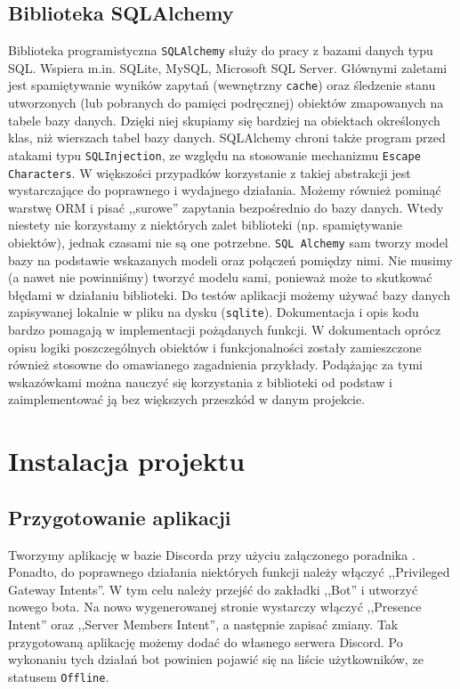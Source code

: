 \documentclass[shortabstract,inz]{iithesis}
\begin{document}
		\section{Biblioteka SQLAlchemy}
			Biblioteka programistyczna \texttt{SQLAlchemy} służy do pracy z bazami danych typu SQL. Wspiera m.in. SQLite, MySQL, Microsoft SQL Server. Głównymi zaletami jest spamiętywanie wyników zapytań (wewnętrzny \texttt{cache}) oraz śledzenie stanu utworzonych (lub pobranych do pamięci podręcznej) obiektów zmapowanych na tabele bazy danych. Dzięki niej skupiamy się bardziej na obiektach określonych klas, niż wierszach tabel bazy danych. SQLAlchemy chroni także program przed atakami typu \texttt{SQLInjection}, ze względu na stosowanie mechanizmu \texttt{Escape Characters}. W większości przypadków korzystanie z takiej abstrakcji jest wystarczające do poprawnego i wydajnego działania. Możemy również pominąć warstwę ORM i pisać ,,surowe'' zapytania bezpośrednio do bazy danych. Wtedy niestety nie korzystamy z niektórych zalet biblioteki (np. spamiętywanie obiektów), jednak czasami nie są one potrzebne. \texttt{SQL Alchemy} sam tworzy model bazy na podstawie wskazanych modeli oraz połączeń pomiędzy nimi. Nie musimy (a nawet nie powinniśmy) tworzyć modelu sami, ponieważ może to skutkować błędami w działaniu biblioteki. Do testów aplikacji możemy używać bazy danych zapisywanej lokalnie w pliku na dysku (\texttt{sqlite}\cite{sqlite}). Dokumentacja i opis kodu\cite{sqlalchemydocs} bardzo pomagają w implementacji pożądanych funkcji. W dokumentach oprócz opisu logiki poszczególnych obiektów i funkcjonalności zostały zamieszczone również stosowne do omawianego zagadnienia przykłady. Podążając za tymi wskazówkami można nauczyć się korzystania z biblioteki od podstaw i zaimplementować ją bez większych przeszkód w danym projekcie.
	
	\chapter{Instalacja projektu}
	\section{Przygotowanie aplikacji}
	Tworzymy aplikację w bazie Discorda przy użyciu załączonego poradnika \cite{discorddev}. Ponadto, do poprawnego działania niektórych funkcji należy włączyć ,,Privileged Gateway Intents''. W tym celu należy przejść do zakładki ,,Bot'' i utworzyć nowego bota. Na nowo wygenerowanej stronie wystarczy włączyć ,,Presence Intent'' oraz ,,Server Members Intent'', a następnie zapisać zmiany. Tak przygotowaną aplikację możemy dodać do własnego serwera Discord\cite{discordserversetup}\cite{discorddev}. Po wykonaniu tych działań bot powinien pojawić się na liście użytkowników, ze statusem \texttt{Offline}.
	
\end{document}
